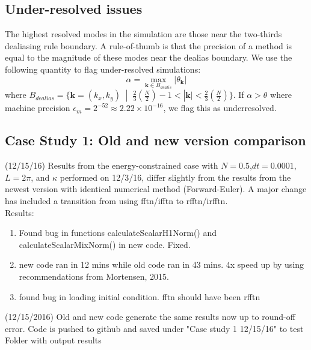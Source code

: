 \documentclass[12pt]{article}
\begin{document}
\subsection{Under-resolved issues}
The highest resolved modes in the simulation are those near the two-thirds dealiasing rule boundary. A rule-of-thumb is that the precision of a method is equal to the magnitude of these modes near the dealias boundary. We use the following quantity to flag under-resolved simulations:
\begin{equation}
\alpha = \max_{\mathbf{k}\in B_{dealis}} |\theta_{\mathbf{k}} |
\end{equation}
where $B_{dealias}=\{ \mathbf{k}=(k_{x},k_{y})  \; \; | \; \; \frac{2}{3}\left(\frac{N}{2}\right)- 1< |\mathbf{k}| <\frac{2}{3}\left(\frac{N}{2}\right)\}$. If $\alpha >\theta$ where machine precision $\epsilon_{m}=2^{-52} \approx 2.22 \times 10^{-16}$, we flag this as underresolved. 

\subsection{Case Study 1: Old and new version comparison}
(12/15/16) Results from the energy-constrained case with $N=0.5$,$dt=0.0001$, $L=2\pi$, and $\kappa$ performed on 12/3/16, differ slightly from the results from the newest version with identical numerical method (Forward-Euler). A major change has included a transition from using fftn/ifftn to rfftn/irfftn. 
\\

Results:
\begin{enumerate}
\item Found bug in functions calculateScalarH1Norm() and calculateScalarMixNorm() in new code. Fixed.
\item new code ran in 12 mins while old code ran in 43 mins. 4x speed up by using recommendations from Mortensen, 2015.
\item found bug in loading initial condition. fftn should have been rfftn
\end{enumerate}

(12/15/2016) Old and new code generate the same results now up to round-off error. Code is pushed to github and saved under "Case study 1 12/15/16" to test Folder with output results
\end{document}
